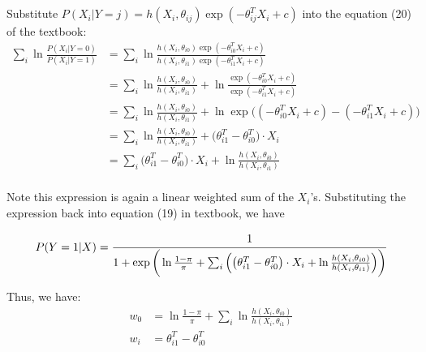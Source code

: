 \documentclass[12pt, letterpaper]{article}
\begin{document}
\section{}

Substitute $P(X_i|Y=j)=h(X_i,\theta_{ij})\exp(-\theta_{ij}^TX_i+c)$ into the equation (20) of the textbook:
\begin{align*}
\sum_i\ln\frac{P(X_i|Y=0)}{P(X_i|Y=1)}
&=\sum_i\ln\frac{h(X_i,\theta_{i0})\exp(-\theta_{i0}^TX_i+c)}{h(X_i,\theta_{i1})\exp(-\theta_{i1}^TX_i+c)}\\
&=\sum_i\ln\frac{h(X_i,\theta_{i0})}{h(X_i,\theta_{i1})}+\ln\frac{\exp(-\theta_{i0}^TX_i+c)}{\exp(-\theta_{i1}^TX_i+c)}\\
&=\sum_i\ln\frac{h(X_i,\theta_{i0})}{h(X_i,\theta_{i1})}+\ln\exp\big({(-\theta_{i0}^TX_i+c)}-{(-\theta_{i1}^TX_i+c)}\big)\\
&=\sum_i\ln\frac{h(X_i,\theta_{i0})}{h(X_i,\theta_{i1})}+\big({\theta_{i1}^T-\theta_{i0}^T\big)\cdot X_i}\\
&=\sum_i\big({\theta_{i1}^T-\theta_{i0}^T\big)\cdot X_i}+\ln\frac{h(X_i,\theta_{i0})}{h(X_i,\theta_{i1})}\\
\end{align*}

Note this expression is again a linear weighted sum of the $X_i$'s. Substituting
the expression back into equation (19) in textbook, we have

\[P(Y=1|X)=\cfrac{1}{1+\exp\bigg(\ln\frac{1-\pi}{\pi}+\sum_i\Big(\big({\theta_{i1}^T-\theta_{i0}^T\big)\cdot X_i}+\ln\frac{h(X_i,\theta_{i0})}{h(X_i,\theta_{i1})}\Big)\bigg)}\]

Thus, we have:
\begin{align*}
w_0&=\ln\frac{1-\pi}{\pi}+\sum_i\ln\frac{h(X_i,\theta_{i0})}{h(X_i,\theta_{i1})}\\
w_i&=\theta_{i1}^T-\theta_{i0}^T
\end{align*}
\end{document}
